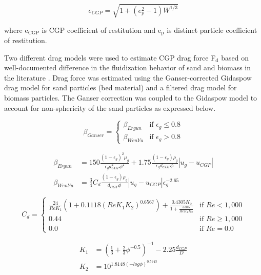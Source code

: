 \begin{equation}
    e_{CGP} = \sqrt{1 + (e_p^2 - 1) W^{1/3}}
\end{equation}

\noindent where e$_\text{CGP}$ is CGP coefficient of restitution and e$_\text{p}$ is distinct particle coefficient of restitution.

Two different drag models were used to estimate CGP drag force F$_\text{d}$ based on well-documented difference in the fluidization behavior of sand and biomass in the literature \cite{Oliveira-2013}. Drag force was estimated using the Ganser-corrected Gidaspow drag model for sand particles (bed material) and a filtered drag model for biomass particles. The Ganser correction \cite{Ganser-1993} was coupled to the Gidaspow model \cite{Gidaspow-1994} to account for non-sphericity of the sand particles as expressed below.

\begin{equation}
    \beta_{Ganser} =
    \begin{cases}
        \beta_{Ergun} & \text{if } \epsilon_g \leq 0.8 \\
        \beta_{WenYu} & \text{if } \epsilon_g > 0.8
    \end{cases}
\end{equation}

\begin{align}
    \beta_{Ergun} &= 150 \frac{(1 - \epsilon_g)^2 \mu_g}{\epsilon_g d^2_{CGP} \phi^2} + 1.75 \frac{(1 - \epsilon_g) \rho_g}{\epsilon_g d_{CGP} \phi} |u_g - u_{CGP}| \\
    \beta_{WenYu} &= \frac{3}{4} C_d \frac{(1 - \epsilon_g) \rho_g}{d_{CGP} \phi} |u_g - u_{CGP}| \epsilon_g^{-2.65}
\end{align}

\begin{equation}
    C_d =
    \begin{cases}
        \frac{24}{Re K_1} (1 + 0.1118(Re K_1 K_2)^{0.6567}) + \frac{0.4305 K_2}{1 + \frac{3305}{Re K_1 K_2}} & \text{if } Re < 1,000 \\
        0.44 & \text{if } Re \geq 1,000 \\
        0.0 & \text{if } Re = 0.0
    \end{cases}
\end{equation}

\begin{align}
    K_1 &= \left(\frac{1}{3} + \frac{2}{3} \phi^{-0.5} \right)^{-1} - 2.25 \frac{d_{CGP}}{D} \\
    K_2 &= 10^{1.8148 (-log \phi)^{0.5743}}
\end{align}

